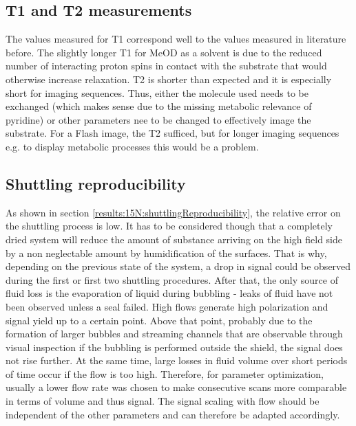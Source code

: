         \subsection{T1 and T2 measurements}
        The values measured for T1 correspond well to the values measured in literature before. The slightly longer T1 for MeOD as a solvent is due to the reduced number of interacting proton spins in contact with the substrate that would otherwise increase relaxation. T2 is shorter than expected and it is especially short for imaging sequences. Thus, either the molecule used needs to be exchanged (which makes sense due to the missing metabolic relevance of pyridine) or other parameters nee to be changed to effectively image the substrate. For a Flash image, the T2 sufficed, but for longer imaging sequences e.g. to display  metabolic processes this would be a problem.
        \subsection{Shuttling reproducibility}
            As shown in section \ref{results:15N:shuttlingReproducibility}, the relative error on the shuttling process is low. It has to be considered though that a completely dried system will reduce the amount of substance arriving on the high field side by a non neglectable amount by humidification of the surfaces. That is why, depending on the previous state of the system, a drop in signal could be observed during the first or first two shuttling procedures. After that, the only source of fluid loss is the evaporation of liquid during bubbling - leaks of fluid have not been observed unless a seal failed. High flows generate high polarization  and signal yield up to a certain point. Above that point, probably due to the formation of larger bubbles and streaming channels that are observable through visual inspection if the bubbling is performed outside the shield, the signal does not rise further. At the same time, large losses in fluid volume over short periods of time occur if the flow is too high. Therefore, for parameter optimization, usually  a lower flow rate was chosen to make consecutive scans more comparable in terms of volume and thus signal. The signal scaling with flow should be independent of the other parameters and can therefore be adapted accordingly.
